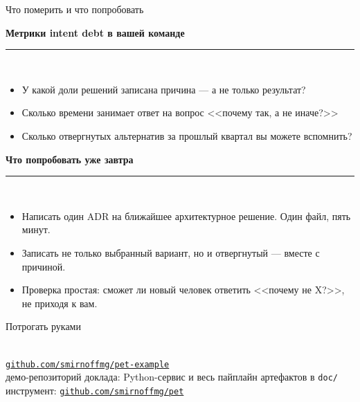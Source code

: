 \documentclass[11pt, aspectratio=169]{beamer}
\begin{document}
\begin{frame}{Что померить и что попробовать}
  \vspace{0.25cm}

  \textbf{\small Метрики intent debt в вашей команде}\\[-6pt]
  \textcolor{mutedText}{\rule{\linewidth}{0.4pt}}\\[3pt]
  \begin{itemize}
    \setlength\itemsep{0.15em}
    \footnotesize
    \item У какой доли решений записана причина --- а не только результат?
    \item Сколько времени занимает ответ на вопрос <<почему так, а не иначе?>>
    \item Сколько отвергнутых альтернатив за прошлый квартал вы можете вспомнить?
  \end{itemize}

  \vspace{0.4cm}
  \textbf{\small Что попробовать уже завтра}\\[-6pt]
  \textcolor{mutedText}{\rule{\linewidth}{0.4pt}}\\[3pt]
  \begin{itemize}
    \setlength\itemsep{0.15em}
    \footnotesize
    \item Написать один ADR на ближайшее архитектурное решение. Один файл, пять минут.
    \item Записать не только выбранный вариант, но и отвергнутый --- вместе с причиной.
    \item Проверка простая: сможет ли новый человек ответить <<почему не X?>>,
          не приходя к вам.
  \end{itemize}
\end{frame}

\begin{frame}{Потрогать руками}
  \begin{center}
    {\hypersetup{urlcolor=black}%
     }\\[0.4cm]
    \href{https://github.com/smirnoffmg/pet-example}{\texttt{github.com/smirnoffmg/pet-example}}\\[0.15cm]
    {\small\textcolor{mutedText}{демо-репозиторий доклада: Python-сервис и весь пайплайн
    артефактов в \texttt{doc/}}}\\[0.45cm]
    {\small инструмент: \href{https://github.com/smirnoffmg/pet}{\texttt{github.com/smirnoffmg/pet}}}
  \end{center}
\end{frame}
\end{document}
